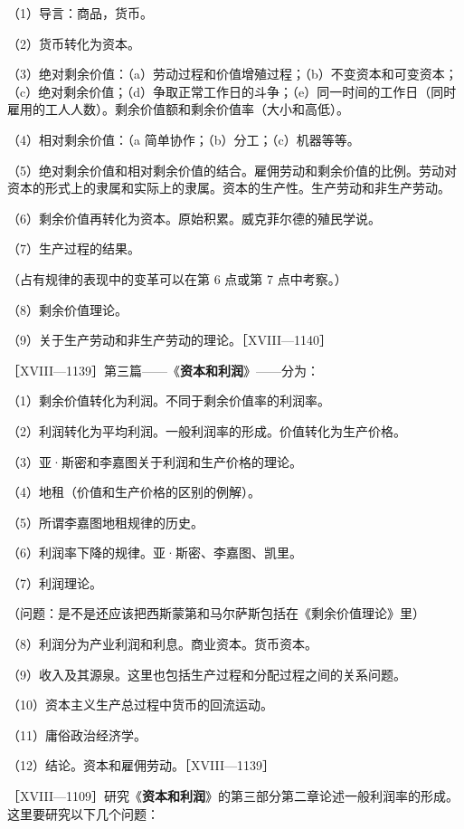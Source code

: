 （1）导言：商品，货币。

（2）货币转化为资本。

（3）绝对剩余价值：（a）劳动过程和价值增殖过程；（b）不变资本和可变资本；（c）绝对剩余价值；（d）争取正常工作日的斗争；（e）同一时间的工作日（同时雇用的工人人数）。剩余价值额和剩余价值率（大小和高低）。

（4）相对剩余价值：（a 简单协作；（b）分工；（c）机器等等。

（5）绝对剩余价值和相对剩余价值的结合。雇佣劳动和剩余价值的比例。劳动对资本的形式上的隶属和实际上的隶属。资本的生产性。生产劳动和非生产劳动。

（6）剩余价值再转化为资本。原始积累。威克菲尔德的殖民学说。

（7）生产过程的结果。

（占有规律的表现中的变革可以在第 6 点或第 7 点中考察。）

（8）剩余价值理论。

（9）关于生产劳动和非生产劳动的理论。［XVIII—1140］


［XVIII—1139］第三篇——《\textbf{资本和利润}》——分为：

（1）剩余价值转化为利润。不同于剩余价值率的利润率。

（2）利润转化为平均利润。一般利润率的形成。价值转化为生产价格。

（3）亚·斯密和李嘉图关于利润和生产价格的理论。

（4）地租（价值和生产价格的区别的例解）。

（5）所谓李嘉图地租规律的历史。

（6）利润率下降的规律。亚·斯密、李嘉图、凯里。

（7）利润理论。

（问题：是不是还应该把西斯蒙第和马尔萨斯包括在《剩余价值理论》里）

（8）利润分为产业利润和利息。商业资本。货币资本。

（9）收入及其源泉。这里也包括生产过程和分配过程之间的关系问题。

（10）资本主义生产总过程中货币的回流运动。

（11）庸俗政治经济学。

（12）结论。资本和雇佣劳动。［XVIII—1139］


［XVIII—1109］研究《\textbf{资本和利润}》的第三部分第二章论述一般利润率的形成。这里要研究以下几个问题：

